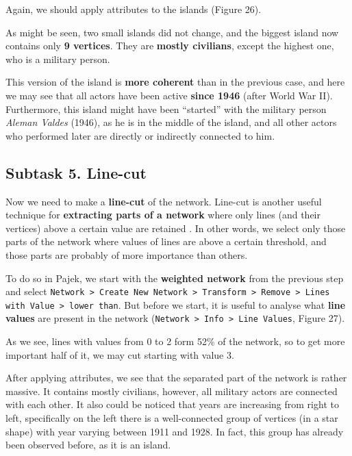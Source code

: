 \FloatBarrier

Again, we should apply attributes to the islands (Figure 26).

\FloatBarrier

As might be seen, two small islands did not change, and the biggest island now contains only \textbf{9 vertices}. They are \textbf{mostly civilians}, except the highest one, who is a military person.

This version of the island is \textbf{more coherent} than in the previous case, and here we may see that all actors have been active \textbf{since 1946} (after World War II). Furthermore, this island might have been “started” with the military person \textit{Aleman Valdes} (1946), as he is in the middle of the island, and all other actors who performed later are directly or indirectly connected to him.
\clearpage


\subsection{Subtask 5. Line-cut}

Now we need to make a \textbf{line-cut} of the network. Line-cut is another useful technique for \textbf{extracting parts of a network} where only lines (and their vertices) above a certain value are retained \cite{batagelj_doreian_ferligoj_kejzar_2014}. In other words, we select only those parts of the network where values of lines are above a certain threshold, and those parts are probably of more importance than others.

To do so in Pajek, we start with the \textbf{weighted network} from the previous step and select \texttt{Network > Create New Network > Transform > Remove > Lines with Value > lower than}. But before we start, it is useful to analyse what \textbf{line values} are present in the network (\texttt{Network > Info > Line Values}, Figure 27).

\FloatBarrier

As we see, lines with values from 0 to 2 form 52\% of the network, so to get more important half of it, we may cut starting with value 3.

\FloatBarrier

After applying attributes, we see that the separated part of the network is rather massive. It contains mostly civilians, however, all military actors are connected with each other. It also could be noticed that years are increasing from right to left, specifically on the left there is a well-connected group of vertices (in a star shape) with year varying between 1911 and 1928. In fact, this group has already been observed before, as it is an island.


